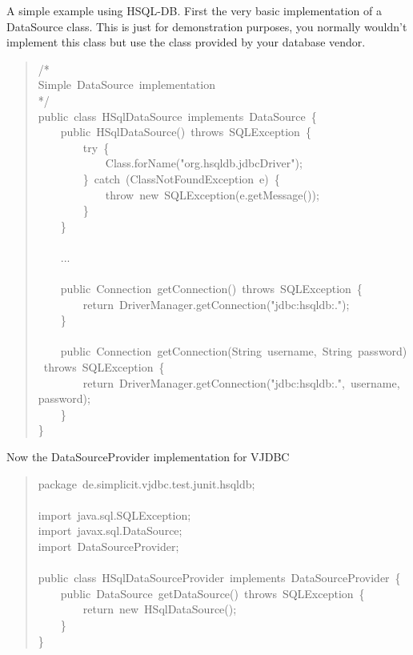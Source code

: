 \documentclass[10pt,a4paper,english]{article}
\begin{document}
A simple example using HSQL-DB. First the very basic implementation of a DataSource class. This is just for demonstration purposes, you normally wouldn't implement this class but use the class provided by your database vendor.
\begin{quote}{\ttfamily \raggedright \noindent
/*~\\
Simple~DataSource~implementation~\\
*/~\\
public~class~HSqlDataSource~implements~DataSource~{\{}~\\
~~~~public~HSqlDataSource()~throws~SQLException~{\{}~\\
~~~~~~~~try~{\{}~\\
~~~~~~~~~~~~Class.forName("org.hsqldb.jdbcDriver");~\\
~~~~~~~~{\}}~catch~(ClassNotFoundException~e)~{\{}~\\
~~~~~~~~~~~~throw~new~SQLException(e.getMessage());~\\
~~~~~~~~{\}}~\\
~~~~{\}}~\\
~\\
~~~~...~\\
~\\
~~~~public~Connection~getConnection()~throws~SQLException~{\{}~\\
~~~~~~~~return~DriverManager.getConnection("jdbc:hsqldb:.");~\\
~~~~{\}}~\\
~\\
~~~~public~Connection~getConnection(String~username,~String~password)~throws~SQLException~{\{}~\\
~~~~~~~~return~DriverManager.getConnection("jdbc:hsqldb:.",~username,~password);~\\
~~~~{\}}~\\
{\}}
}\end{quote}

Now the DataSourceProvider implementation for VJDBC
\begin{quote}{\ttfamily \raggedright \noindent
package~de.simplicit.vjdbc.test.junit.hsqldb;~\\
~\\
import~java.sql.SQLException;~\\
import~javax.sql.DataSource;~\\
import~DataSourceProvider;~\\
~\\
public~class~HSqlDataSourceProvider~implements~DataSourceProvider~{\{}~\\
~~~~public~DataSource~getDataSource()~throws~SQLException~{\{}~\\
~~~~~~~~return~new~HSqlDataSource();~\\
~~~~{\}}~\\
{\}}
}\end{quote}
\end{document}
